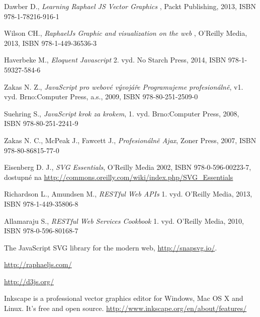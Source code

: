 \begin{thebibliography}{99}                                \label{literatura}




Dawber D.,
{\it Learning Raphael JS Vector Graphics }, 
 Packt Publishing, 2013, ISBN 978-1-78216-916-1
         
 
 
 Wilson CH., {\it RaphaelJs Graphic and visualization on the web} , 
O'Reilly Media, 2013, ISBN 978-1-449-36536-3
         

Haverbeke M., 
{\it Eloquent Javascript} 2. vyd. No Starch Press, 2014, ISBN 978-1-59327-584-6


Zakas N. Z., 
{\it JavaScript pro webové vývojáře Programujeme profesionálně},
 v1. vyd. Brno:Computer Press, a.s., 2009,  ISBN 978-80-251-2509-0

Suehring S., 
{\it JavaScript krok za krokem},
1. vyd. Brno:Computer Press, 2008, ISBN 978-80-251-2241-9

Zakas N. C., McPeak J., Fawcett J.,
{\it Profesionálně Ajax},
Zoner Press, 2007,  ISBN 978-80-86815-77-0

Eisenberg D. J., {\it SVG Essentials}, 
O'Reilly Media 2002, ISBN  978-0-596-00223-7,  dostupné na \url{http://commons.oreilly.com/wiki/index.php/SVG_Essentials}

Richardson L., Amundsen M., {\it RESTful Web APIs} 
1. vyd. O'Reilly Media, 2013, 
ISBN 978-1-449-35806-8

Allamaraju S., {\it RESTful Web Services Cookbook} 
1. vyd. O'Reilly Media, 2010, 
ISBN 978-0-596-80168-7

The JavaScript SVG library for the modern web,
\url{http://snapsvg.io/}.



\url{ http://raphaeljs.com/}

\url {http://d3js.org/}


Inkscape is a professional vector graphics editor for Windows, Mac OS X and Linux. It's free and open source.
\url {http://www.inkscape.org/en/about/features/}

\end{thebibliography}
